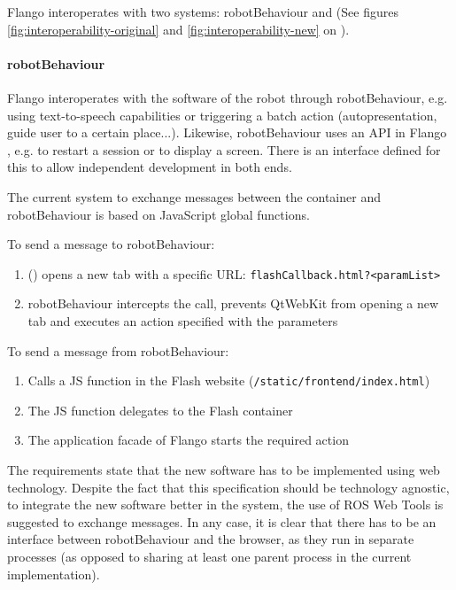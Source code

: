 Flango \cm interoperates with two systems: robotBehaviour and \flangobe (See figures \ref{fig:interoperability-original} and \ref{fig:interoperability-new} on \pageref{fig:interoperability-original}).

\paragraph{robotBehaviour} Flango \cm interoperates with the software of the robot through robotBehaviour, e.g. using text-to-speech capabilities or triggering a batch action (autopresentation, guide user to a certain place...).
Likewise, robotBehaviour uses an \ac{API} in Flango \cm , e.g. to restart a session or to display a screen.
There is an interface defined for this to allow independent development in both ends.

The current system to exchange messages between the \flash container and robotBehaviour is based on JavaScript global functions.

To send a message to robotBehaviour:
\begin{enumerate}
    \item \cm (\flash) opens a new tab with a specific \ac{URL}: \texttt{flashCallback.html?\textless paramList\textgreater}
    \item robotBehaviour intercepts the call, prevents QtWebKit from opening a new tab and executes an action specified with the parameters
\end{enumerate}

To send a message from robotBehaviour:
\begin{enumerate}
    \item Calls a \ac{JS} function in the Flash website (\texttt{/static/frontend/index.html})
    \item The \ac{JS} function delegates to the Flash container
    \item The application facade of Flango \cm starts the required action
\end{enumerate}

The requirements state that the new software has to be implemented using web technology. 
Despite the fact that this specification should be technology agnostic, to integrate the new software better in the system, the use of \ac{ROS} Web Tools is suggested to exchange messages.
In any case, it is clear that there has to be an interface between robotBehaviour and the browser, as they run in separate processes (as opposed to sharing at least one parent process in the current implementation).

